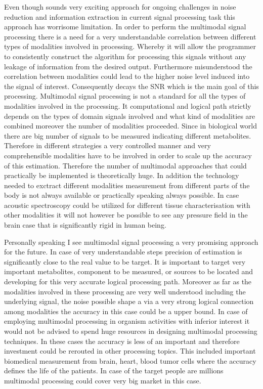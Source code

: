 Even though sounds very exciting approach for ongoing challenges in noise reduction and information extraction in current signal processing task this approach has worrisome limitation. In order to perform the multimodal signal processing there is a need for a very understandable correlation between different types of modalities involved in processing. Whereby it will allow the programmer to consistently construct the algorithm for processing this signals without any leakage of information from the desired output. Furthermore misunderstood the correlation between modalities could lead to the higher noise level induced into the signal of interest. Consequently decays the SNR which is the main goal of this processing. Multimodal signal processing is not a standard for all the types of modalities involved in the processing. It computational and logical path strictly depends on the types of domain signals involved and what kind of modalities are combined moreover the number of modalities proceeded. Since in biological world there are big number of signals to be measured indicating different metabolites. Therefore in different strategies a very controlled manner and very comprehensible modalities have to be involved in order to scale up the accuracy of this estimation. Therefore the number of multimodal approaches that could practically be implemented is theoretically huge. In addition the technology needed to exctract different modalities measurement from different parts of the body is not always available or practically speaking always possible. In case acoustic spectroscopy could be utilized for different tissue characterisation with other modalities it will not however be possible to see any pressure field in the brain case that is significantly rigid in human being.  

Personally speaking I see multimodal signal processing a very promising approach for the future. In case of very understandable steps precision of estimation is significantly close to the real value to be target. It is important to target very important metabolites, component to be measured, or sources to be located and developing for this very accurate logical processing path. Moreover as far as the modalities involved in these processing are very well understood including the underlying signal, the noise possible shape a via a very strong logical connection among modalities the accuracy in this case could be a upper bound. In case of employing multimodal processing in organism activities with inferior interest it would not be advised to spend huge resources in designing multimodal processing techniques. In these cases the accuracy is less of an important and therefore investment could be rerouted in other processing topics. This included important biomedical measurement from brain, heart, blood tumor cells where the accuracy defines the life of the patients. In case of the target people are millions multimodal processing could cover very big market in this case.  

